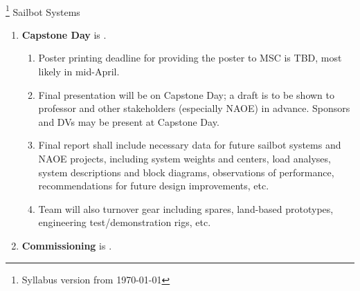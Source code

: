 \documentclass[10pt]{article}
\newcommand{\projectname}{Sailbot Systems}
\begin{document}
\begin{center}
\textbf{\usnaCourseNumber\ \usnaCourseName}\\
\textbf{\courseTerm}\footnote{Syllabus version from \today} \projectname
\end{center}

\begin{enumerate}
\item \textbf{Capstone Day} is . 
\begin{enumerate}
\item Poster printing deadline for providing the poster to MSC is {TBD, most likely in mid-April}. 
\item Final presentation will be on Capstone Day; a draft is to be shown to professor and other stakeholders (especially NAOE) in advance. Sponsors and DVs may be present at Capstone Day.
\item Final report shall include necessary data for future sailbot systems and NAOE projects, including system weights and centers, load analyses, system descriptions and block diagrams, observations of performance, recommendations for future design improvements, etc.  
\item Team will also turnover gear including spares, land-based prototypes, engineering test/demonstration rigs, etc.
\end{enumerate}

\item \textbf{Commissioning} is .
\end{enumerate}
\end{document}
